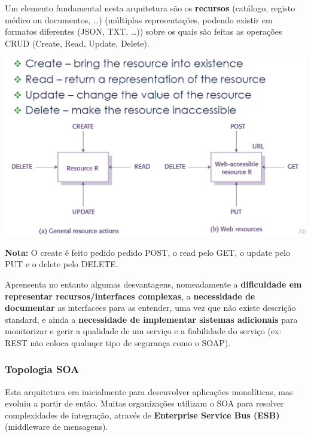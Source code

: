 \documentclass{article}
\begin{document}
\vspace{2mm}

Um elemento fundamental nesta arquitetura são os \textbf{recursos}
(catálogo, registo médico ou documentos, \dots) (múltiplas representações,
podendo existir em formatos diferentes (JSON, TXT, \dots)) sobre os quais são feitas as operações CRUD
(Create, Read, Update, Delete).

\begin{center}
  \includegraphics[scale=0.4]{66}
\end{center}

\begin{flushleft}
  \textbf{Nota:} O create é feito pedido pedido POST, o read pelo GET, o update pelo PUT e o delete pelo DELETE.
\end{flushleft}

Aprensenta no entanto algumas desvantagens, nomeadamente a
\textbf{dificuldade em representar recursos/interfaces complexas},
a \textbf{necessidade de documentar} as interfacees para as entender, uma vez que não
existe descrição standard, e ainda a \textbf{necessidade de implementar
sistemas adicionais} para monitorizar e gerir a qualidade de
um serviço e a fiabilidade do serviço (ex: REST não
coloca qualuqer tipo de segurança como o SOAP).

\subsubsection*{Topologia SOA}

Esta arquitetura era inicialmente para desenvolver aplicações
monolíticas, mas evoluiu a partir de então. Muitas organizações
utilizam o SOA para resolver complexidades de integração, através
de \textbf{Enterprise Service Bus (ESB)} (middleware de mensagens).
\end{document}

